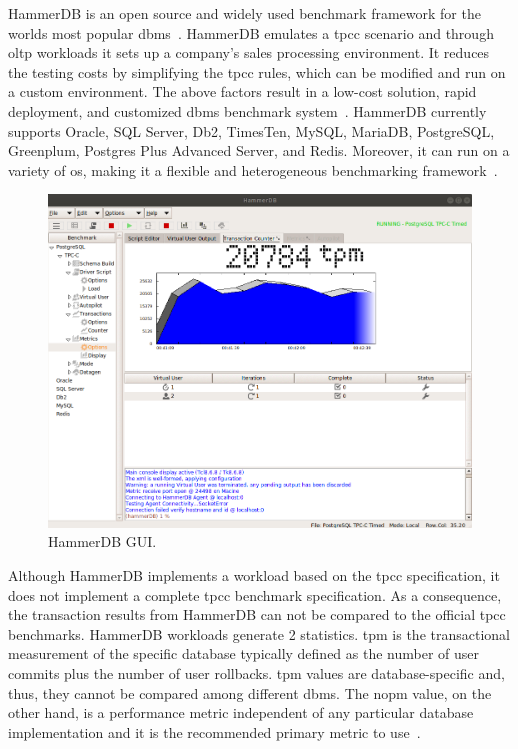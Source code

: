 
 
HammerDB is an open source and widely used benchmark framework for the worlds most popular \gls{dbms}~\cite{scalzo2018database,elgrablyanalise,knoche2016combining,benchmarkchen,ali2019persistent,yu2015design,koccak2018software,koccak2018software}.   HammerDB emulates a \gls{tpcc} scenario  and through \gls{oltp} workloads it sets up a company's sales processing environment. It reduces the testing costs by simplifying the \gls{tpcc} rules, which can be modified and run on a custom environment. The above factors result in a low-cost solution, rapid deployment, and customized \gls{dbms} benchmark system~\cite{benchmarkchen,elgrablyanalise,hammerdb}. HammerDB currently supports Oracle, SQL Server, Db2, TimesTen, MySQL, MariaDB, PostgreSQL, Greenplum, Postgres Plus Advanced Server, and Redis. Moreover, it can run on a variety of \gls{os}, making it a  flexible and heterogeneous benchmarking framework~\cite{benchmarkchen}.


\begin{figure}[h!]
    \centering
    \includegraphics[width=0.6\columnwidth]{Chapters/images/hammerdb1.png}
        \caption{HammerDB GUI.}
    \label{fig:hamerdbgui}
    \end{figure}

Although HammerDB implements a workload based on the \gls{tpcc} specification, it does not implement a complete \gls{tpcc} benchmark specification. As a consequence,  the transaction results from HammerDB can not be compared  to the official \gls{tpcc} benchmarks. HammerDB workloads generate 2 statistics. \gls{tpm} is the transactional measurement of the specific database typically defined as the number of user commits plus the number of user rollbacks. \gls{tpm} values are database-specific and, thus, they cannot be compared among different \gls{dbms}. The \gls{nopm} value, on the other hand, is a performance metric independent of any particular database implementation and it is the recommended primary metric to use~\cite{hammerdb}.

